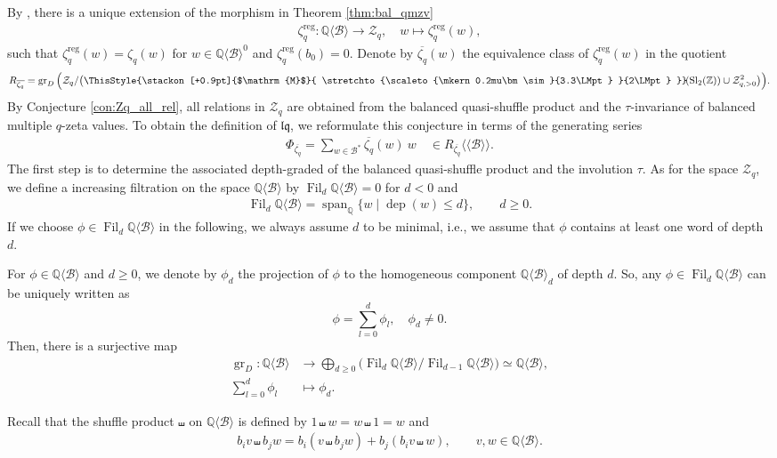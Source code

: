\documentclass[12pt,reqno]{amsart}
\numberwithin{equation}{section}
\theoremstyle{definition}
\newcommand{\medtildeM}{ \ThisStyle{\stackon[+0.9pt]{$\mathrm{M}$}{ \stretchto{\scaleto{\mkern0.2mu\bm\sim}{3.3\LMpt} }{2\LMpt} }}}
\newcommand{\ZZ}{\mathbb{Z}}
\newcommand{\QQ}{\mathbb{Q}}
\newcommand{\quasimod}{\ensuremath{\medtildeM\!(\operatorname{Sl}_2(\ZZ))}}
\newcommand{\Z}{\mathcal{Z}}
\newcommand{\grD}{\operatorname{gr}_D}
\newcommand{\fil}{\operatorname{Fil}}
\newcommand{\dep}{\operatorname{dep}}
\newcommand{\B}{\mathcal{B}}
\newcommand{\QB}{\QQ\langle \B\rangle}
\newcommand{\lqq}{\mathfrak{lq}}
\begin{document}
\vspace{0,2cm}
By \cite[Theorem 4.3]{Bu24-2}, there is a unique extension of the morphism in Theorem \ref{thm:bal_qmzv}
\begin{align}
\zeta_q^{\operatorname{reg}}: \QB\to \Z_q,\quad w\mapsto \zeta_q^{\operatorname{reg}}(w),
\end{align}
such that $\zeta_q^{\operatorname{reg}}(w)=\zeta_q(w)$ for $w\in \QB^0$ and $\zeta_q^{\operatorname{reg}}(b_0)=0$.
Denote by $\overline{\zeta_q}(w)$ the equivalence class of $\zeta_q^{\operatorname{reg}}(w)$ in the quotient 
\begin{align*} \label{eq:quotient_space}
R_{\overline{\zeta_q}}=\grD\Big(\Z_q/\big(\quasimod\cup \Z_{q,>0}^2\big)\Big).
\end{align*}
By Conjecture \ref{con:Zq_all_rel}, all relations in $\Z_q$ are obtained from the balanced quasi-shuffle product and the $\tau$-invariance of balanced multiple $q$-zeta values. To obtain the definition of $\lqq$, we reformulate this conjecture in terms of the generating series
\begin{align}
\Phi_{\overline{\zeta_q}}=\sum_{w\in \B^*} \overline{\zeta_q}(w)\ \!w \quad \in R_{\overline{\zeta_q}}\langle\langle \B\rangle\rangle.
\end{align}
The first step is to determine the associated depth-graded of the balanced quasi-shuffle product and the involution $\tau$.
As for the space $\Z_q$, we define a increasing filtration on the space $\QB$ by $\fil_d\QB=0$ for $d<0$ and 
\begin{align*}
\fil_d \QB=\operatorname{span}_\QQ\{w\mid \dep(w)\leq d\}, \qquad d\geq0.
\end{align*}
If we choose $\phi\in \fil_d\QB$ in the following, we always assume $d$ to be minimal, i.e., we assume that $\phi$ contains at least one word of depth $d$.

For $\phi\in \QB$ and $d\geq0$, we denote by $\phi_d$ the projection of $\phi$ to the homogeneous component $\QB_d$ of depth $d$. So, any $\phi\in \fil_d\QB$ can be uniquely written as
\[\phi=\sum_{l=0}^{d} \phi_l,\quad \phi_d\neq 0.\]
Then, there is a surjective map
\begin{align} \label{eq:def_grD}
\grD:\QB&\to\bigoplus_{d\geq0} \big(\fil_d \QB /\fil_{d-1} \QB\big) \simeq \QB, \\
\sum_{l=0}^d \phi_l&\mapsto \phi_d. \nonumber
\end{align}

Recall that the shuffle product $\shuffle$ on $\QB$ is defined by $1\shuffle w=w\shuffle 1=w$ and 
\begin{align} \label{eq:shuffle}
b_iv\shuffle b_j w= b_i(v\shuffle b_j w)+b_j(b_iv\shuffle w),\qquad v,w\in\QB.
\end{align}
\end{document}
